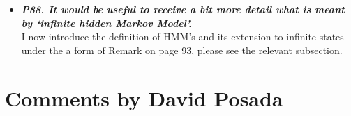 \documentclass[english]{article}
\begin{document}
\begin{itemize}
\begin{quote}
\myeditsvtwenty
\end{quote}


\item {
{\it
\textbf{
P88. It would be useful to receive a bit more detail what is meant by `infinite hidden Markov Model'.
}%
}%
}%
\\
I now introduce the definition of HMM's and its extension to infinite states under the a form of Remark on page 93,
please see the relevant subsection.


\end{itemize}


\section*{Comments by David Posada}
\end{document}
